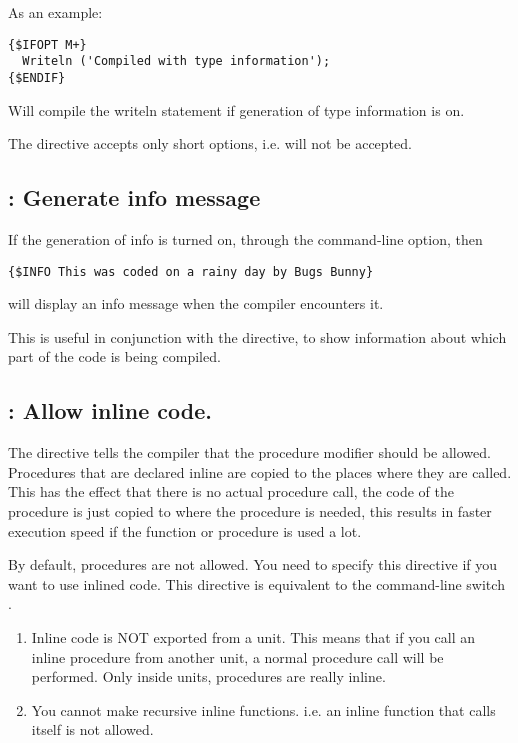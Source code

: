 As an example:
\begin{verbatim}
{$IFOPT M+}
  Writeln ('Compiled with type information');
{$ENDIF}
\end{verbatim}
Will compile the writeln statement if generation of type information is on.

\begin{remark}The  directive accepts only short options,
i.e.  will not be accepted.
\end{remark}

\subsection{ : Generate info message}

If the generation of info is turned on, through the  command-line
option, then
\begin{verbatim}
{$INFO This was coded on a rainy day by Bugs Bunny}
\end{verbatim}
will display an info message when the compiler encounters it.

This is useful in conjunction with the  directive, to show
information about which part of the code is being compiled.

\subsection{ : Allow inline code.}

The  directive tells the compiler that the 
procedure modifier should be allowed. Procedures that are declared inline
are copied to the places where they are called. This has the effect that
there is no actual procedure call, the code of the procedure is just copied
to where the procedure is needed, this results in faster execution speed if
the function or procedure is used a lot.

By default,  procedures are not allowed. You need to specify
this directive if you want to use inlined code. This directive is
equivalent to the command-line switch .

\begin{remark}\begin{enumerate}\item Inline
code is NOT exported from a unit. This means that if you call an
inline procedure from another unit, a normal procedure call will be
performed. Only inside units,  procedures are really inline.
\item You cannot make recursive inline functions. i.e. an inline function
that calls itself is not allowed.
\end{enumerate}
\end{remark}


